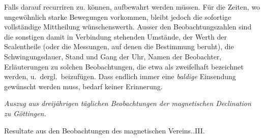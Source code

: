 \par\clearpage
{}\noindent Falls darauf recurriren zu. können, aufbewahrt werden müssen. Für die Zeiten, wo ungewöhnlich starke Bewegungen vorkommen, bleibt jedoch die sofortige vollständige Mittheilung wünschenswerth. Ausser den Beobachtungszahlen sind die sonstigen damit in Verbindung stehenden Umstände, der Werth der Scalentheile (oder die Messungen, auf denen die Bestimmung beruht), die Schwingungsdauer, Stand und Gang der Uhr, Namen der Beobachter, Erläuterungen zu solchen Beobachtungen, die etwa als zweifelhaft bezeichnet werden, u.\ dergl.\ beizufügen. Dass endlich immer eine \textit{baldige} Einsendung gewünscht werden muss, bedarf keiner Erinnerung.

\vspace{6mm}
\begin{center}\large\textit{Auszug aus dreijährigen täglichen Beobachtungen der magnetischen Declination zu Göttingen.}\end{center}
\begin{center}\small Resultate aus den Beobachtungen des magnetischen Vereins..\quad III.\end{center}

